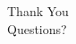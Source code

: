 \documentclass[aspectratio=169,10pt]{beamer}
\begin{document}


\begin{frame}[standout]
    \Huge Thank You\\[0.5em]
    \normalsize Questions?
\end{frame}
\end{document}
